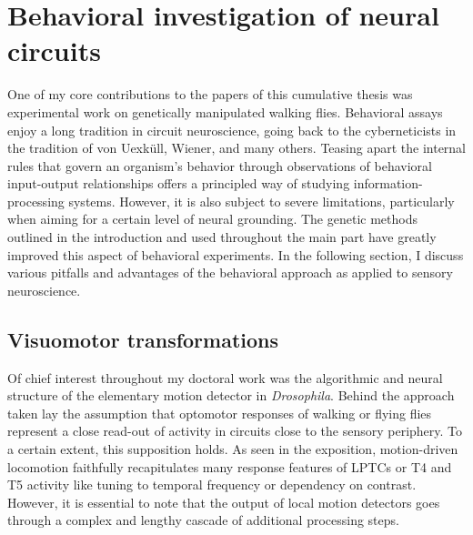
\section{Behavioral investigation of neural circuits}

One of my core contributions to the papers of this cumulative thesis was experimental work on genetically manipulated walking flies. Behavioral assays enjoy a long tradition in circuit neuroscience, going back to the cyberneticists in the tradition of von Uexküll, Wiener, and many others. Teasing apart the internal rules that govern an organism's behavior through observations of behavioral input-output relationships offers a principled way of studying information-processing systems. However, it is also subject to severe limitations, particularly when aiming for a certain level of neural grounding. The genetic methods outlined in the introduction and used throughout the main part have greatly improved this aspect of behavioral experiments. In the following section, I discuss various pitfalls and advantages of the behavioral approach as applied to sensory neuroscience.


\subsection{Visuomotor transformations}
Of chief interest throughout my doctoral work was the algorithmic and neural structure of the elementary motion detector in \textit{Drosophila}. Behind the approach taken lay the assumption that optomotor responses of walking or flying flies represent a close read-out of activity in circuits close to the sensory periphery. To a certain extent, this supposition holds. As seen in the exposition, motion-driven locomotion faithfully recapitulates many response features of LPTCs or T4 and T5 activity like tuning to temporal frequency or dependency on contrast. However, it is essential to note that the output of local motion detectors goes through a complex and lengthy cascade of additional processing steps.

